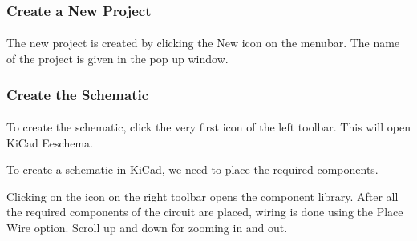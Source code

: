 \subsubsection{Create a New Project}

\paragraph{ } The new project is created by clicking the New icon on the
menubar. The name of the project is given in the pop up window.%

\subsubsection{Create the Schematic}

\paragraph{}  To create the schematic, click the very first icon of the
left toolbar.%
This will open KiCad Eeschema.



To create a schematic in KiCad, we need to place the required components. %


 Clicking on the icon on the right toolbar opens the component library. After all the required components of the circuit are placed, wiring is
done using the Place Wire option. %
 Scroll up and down for zooming in and out.




